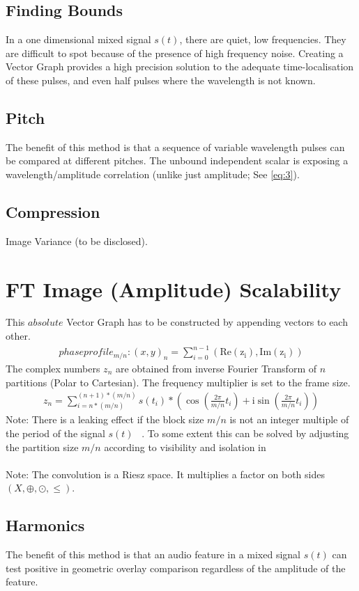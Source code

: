 \documentclass{report}
\begin{document}
\subsection{Finding Bounds}
In a one dimensional mixed signal $s(t)$, there are quiet, low frequencies. They are difficult to spot because of the presence of high frequency noise. Creating a Vector Graph provides a high precision solution to the adequate time-localisation of these pulses, and even half pulses where the wavelength is not known.
\subsection{Pitch}
The benefit of this method is that a sequence of variable wavelength pulses can be compared at different pitches. The unbound independent scalar is exposing a wavelength/amplitude correlation (unlike just amplitude; See \eqref{eq:3}).
\subsection{Compression}
Image Variance (to be disclosed).
\section{FT Image (Amplitude) Scalability}
This $absolute$ Vector Graph has to be constructed by appending vectors to each other.
\begin{align}
phaseprofile_{m/n}: (x,y)_{n}=\sum \limits _{i=0}^{n-1}(\mathrm{Re(z_{i})},\mathrm{Im(z_{i})})
\end{align}
The complex numbers $z_{n}$ are obtained from inverse Fourier Transform of $n$ partitions (Polar to Cartesian). The frequency multiplier is set to the frame size.
\begin{align}
z_{n}= \sum \limits _{i=n*(m/n)}^{(n+1)*(m/n)} s(t_{i})*(\cos(\frac{2\pi}{m/n}t_{i})+\mathrm{i}\sin(\frac{2\pi}{m/n}t_{i}))\label{eq:3}
\end{align}
Note: There is a leaking effect if the block size $m/n$ is not an integer multiple of the period of the signal $s(t)$ ~\cite[Fensterfunktion]{Fensterfunktion}. To some extent this can be solved by adjusting the partition size $m/n$ according to visibility and isolation in ~\cite[Stopeight\_Comparator.tex]{Comparator}\\\\
Note: The convolution is a Riesz space. It multiplies a factor on both sides $(X,\oplus,\odot,\leq)$.
\subsection{Harmonics}
The benefit of this method is that an audio feature in a mixed signal $s(t)$ can test positive in geometric overlay comparison regardless of the amplitude of the feature.

\iffalse
\printbibliography
\fi
{}

\end{document}
